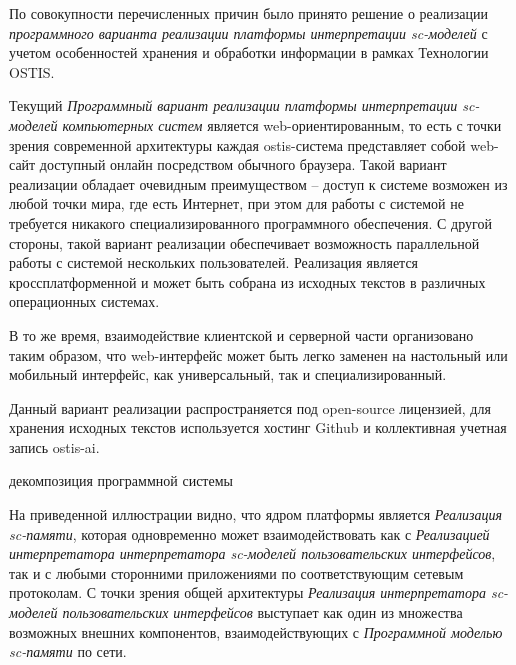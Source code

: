 По совокупности перечисленных причин было принято решение о реализации \textit{программного варианта реализации
платформы интерпретации sc-моделей}  с учетом особенностей хранения и обработки информации в рамках
Технологии OSTIS.

Текущий \textit{Программный вариант реализации платформы интерпретации sc-моделей компьютерных систем} является
web-ориентированным, то есть с точки зрения современной архитектуры каждая \mbox{ostis-система} представляет собой
web-сайт доступный онлайн посредством обычного браузера. Такой вариант реализации обладает очевидным преимуществом --
доступ к системе возможен из любой точки мира, где есть Интернет, при этом для работы с системой не требуется никакого
специализированного программного обеспечения. С другой стороны, такой вариант реализации обеспечивает возможность
параллельной работы с системой нескольких пользователей. Реализация является кроссплатформенной и может быть собрана
из исходных текстов в различных операционных системах.

В то же время, взаимодействие клиентской и серверной части организовано таким образом, что \mbox{web-интерфейс} может
быть легко заменен на настольный или мобильный интерфейс, как универсальный, так и специализированный.

Данный вариант реализации распространяется под open-source лицензией, для хранения исходных текстов используется
хостинг Github и коллективная учетная запись ostis-ai.


\begin{SCn}
\begin{scnrelfromset}{декомпозиция программной системы}
\end{scnrelfromset}
\end{SCn}


На приведенной иллюстрации видно, что ядром платформы является \textit{Реализация sc-памяти},
которая одновременно может взаимодействовать как с \textit{Реализацией интерпретатора интерпретатора sc-моделей
пользовательских интерфейсов}, так и с любыми сторонними приложениями по соответствующим сетевым протоколам.
С точки зрения общей архитектуры \textit{Реализация интерпретатора sc-моделей пользовательских интерфейсов} выступает
как один из множества возможных внешних компонентов, взаимодействующих с \textit{Программной моделью sc-памяти} по сети.

